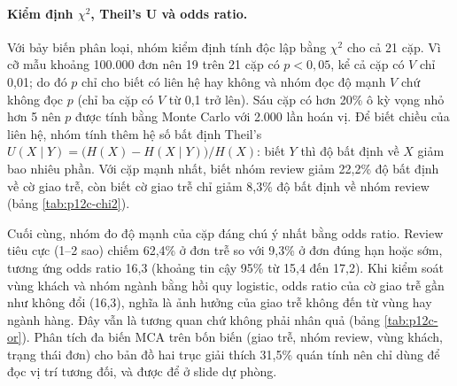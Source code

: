 \paragraph{Kiểm định $\chi^2$, Theil's U và odds ratio.}
Với bảy biến phân loại, nhóm kiểm định tính độc lập bằng $\chi^2$ cho cả 21 cặp. Vì cỡ mẫu khoảng 100.000 đơn nên 19 trên 21 cặp có $p < 0{,}05$, kể cả cặp có $V$ chỉ 0,01; do đó $p$ chỉ cho biết có liên hệ hay không và nhóm đọc độ mạnh $V$ chứ không đọc $p$ (chỉ ba cặp có $V$ từ 0,1 trở lên). Sáu cặp có hơn 20\% ô kỳ vọng nhỏ hơn 5 nên $p$ được tính bằng Monte Carlo với 2.000 lần hoán vị. Để biết chiều của liên hệ, nhóm tính thêm hệ số bất định Theil's $U(X \mid Y) = \bigl(H(X) - H(X \mid Y)\bigr) / H(X)$: biết $Y$ thì độ bất định về $X$ giảm bao nhiêu phần. Với cặp mạnh nhất, biết nhóm review giảm 22,2\% độ bất định về cờ giao trễ, còn biết cờ giao trễ chỉ giảm 8,3\% độ bất định về nhóm review (bảng \ref{tab:p12c-chi2}).

Cuối cùng, nhóm đo độ mạnh của cặp đáng chú ý nhất bằng odds ratio. Review tiêu cực (1--2 sao) chiếm 62,4\% ở đơn trễ so với 9,3\% ở đơn đúng hạn hoặc sớm, tương ứng odds ratio 16,3 (khoảng tin cậy 95\% từ 15,4 đến 17,2). Khi kiểm soát vùng khách và nhóm ngành bằng hồi quy logistic, odds ratio của cờ giao trễ gần như không đổi (16,3), nghĩa là ảnh hưởng của giao trễ không đến từ vùng hay ngành hàng. Đây vẫn là tương quan chứ không phải nhân quả (bảng \ref{tab:p12c-or}). Phân tích đa biến MCA trên bốn biến (giao trễ, nhóm review, vùng khách, trạng thái đơn) cho bản đồ hai trục giải thích 31,5\% quán tính nên chỉ dùng để đọc vị trí tương đối, và được để ở slide dự phòng.



